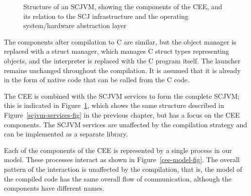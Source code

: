 \begin{figure}[bth]
  \caption{Structure of an SCJVM, showing the components of the CEE,
    and its relation to the SCJ infrastructure and the operating
    system/hardware abstraction layer}
  \label{cee-fig}
\end{figure}

The components after compilation to C are similar, but the object
manager is replaced with a struct manager, which manages C struct
types representing objects, and the interpreter is replaced with the C
program itself.
The launcher remains unchanged throughout the compilation.
It is assumed that it is already in the form of native code that can
be called from the C code.

The CEE is combined with the SCJVM services to form the complete
SCJVM; this is indicated in Figure~\ref{cee-fig}, which shows the same
structure described in Figure~\ref{scjvm-services-fig} in the previous
chapter, but has a focus on the CEE components.
The SCJVM services are unaffected by the compilation strategy and can
be implemented as a separate library.

Each of the components of the CEE is represented by a single \Circus{}
process in our model.
These processes interact as shown in Figure~\ref{cee-model-fig}.
The overall pattern of the interaction is unaffected by the
compilation, that is, the model of the compiled code has the same
overall flow of communication, although the components have different
names.

